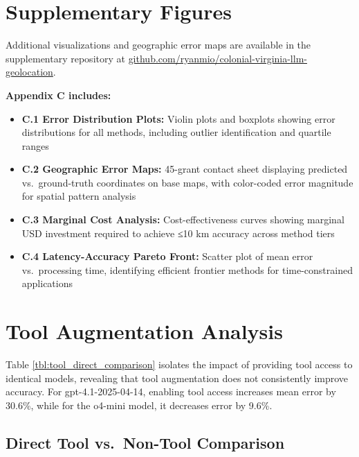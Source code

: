 \section{Supplementary
Figures}\label{appendix-c-supplementary-figures}

Additional visualizations and geographic error maps are available in the
supplementary repository at
\href{https://github.com/ryanmio/colonial-virginia-llm-geolocation/blob/main/paper/APPENDIX_C_Supplementary_Figures.md}{github.com/ryanmio/colonial-virginia-llm-geolocation}.

\textbf{Appendix C includes:}

\begin{itemize}
\tightlist
\item
  \textbf{C.1 Error Distribution Plots:} Violin plots and boxplots
  showing error distributions for all methods, including outlier
  identification and quartile ranges
\item
  \textbf{C.2 Geographic Error Maps:} 45-grant contact sheet displaying
  predicted vs.~ground-truth coordinates on base maps, with color-coded
  error magnitude for spatial pattern analysis
\item
  \textbf{C.3 Marginal Cost Analysis:} Cost-effectiveness curves showing
  marginal USD investment required to achieve ≤10 km accuracy across
  method tiers
\item
  \textbf{C.4 Latency-Accuracy Pareto Front:} Scatter plot of mean error
  vs.~processing time, identifying efficient frontier methods for
  time-constrained applications
\end{itemize}

\section{Tool Augmentation
Analysis}\label{appendix-d-tool-augmentation-analysis}

Table \ref{tbl:tool_direct_comparison} isolates the impact of providing
tool access to identical models, revealing that tool augmentation does
not consistently improve accuracy. For gpt-4.1-2025-04-14, enabling tool
access increases mean error by 30.6\%, while for the o4-mini model, it
decreases error by 9.6\%.

\subsection{Direct Tool vs.~Non-Tool
Comparison}\label{d.1-direct-tool-vs.-non-tool-comparison}


